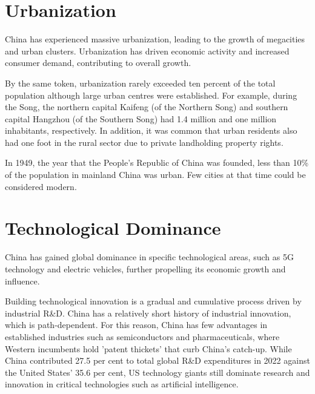 \section{Urbanization}

China has experienced massive urbanization, leading to the growth 
of megacities and urban clusters. Urbanization has driven economic 
activity and increased consumer demand, contributing to 
overall growth.

By the same token, urbanization rarely exceeded ten percent of the 
total population although large urban centres were established. For 
example, during the Song, the northern capital Kaifeng 
(of the Northern Song) and southern capital Hangzhou 
(of the Southern Song) had 1.4 million and one million inhabitants, 
respectively. In addition, it was common that urban residents 
also had one foot in the rural sector due to private landholding 
property rights.

In 1949, the year that the People's Republic of China was founded, 
less than 10\% of the population in mainland China was urban. 
Few cities at that time could be considered modern.

\section{Technological Dominance}

China has gained global dominance in specific technological areas, 
such as 5G technology and electric vehicles, further propelling its 
economic growth and influence.

Building technological innovation is a gradual and cumulative process 
driven by industrial R\&D. China has a relatively short history of 
industrial innovation, which is path-dependent. For this reason, 
China has few advantages in established industries such as 
semiconductors and pharmaceuticals, where Western incumbents hold 
'patent thickets' that curb China's catch-up. While China contributed 
27.5 per cent to total global R\&D expenditures in 2022 against the 
United States' 35.6 per cent, US technology giants still dominate 
research and innovation in critical technologies such as artificial 
intelligence.